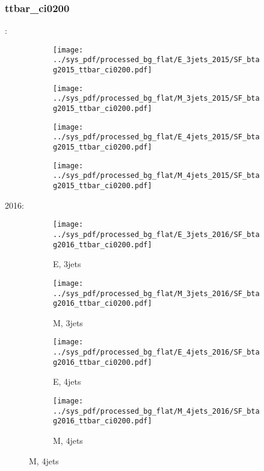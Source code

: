 \documentclass{beamer}
\begin{document}
\begin{frame}
\frametitle{ttbar_ci0200}
\fontsize{5}{1}:
\begin{figure}
\centering
\begin{subfigure}[b]{0.24\textwidth}
\texttt{[image: ../sys\_pdf/processed\_bg\_flat/E\_3jets\_2015/SF\_btag2015\_ttbar\_ci0200.pdf]}
\end{subfigure}
\begin{subfigure}[b]{0.24\textwidth}
\texttt{[image: ../sys\_pdf/processed\_bg\_flat/M\_3jets\_2015/SF\_btag2015\_ttbar\_ci0200.pdf]}
\end{subfigure}
\begin{subfigure}[b]{0.24\textwidth}
\texttt{[image: ../sys\_pdf/processed\_bg\_flat/E\_4jets\_2015/SF\_btag2015\_ttbar\_ci0200.pdf]}
\end{subfigure}
\begin{subfigure}[b]{0.24\textwidth}
\texttt{[image: ../sys\_pdf/processed\_bg\_flat/M\_4jets\_2015/SF\_btag2015\_ttbar\_ci0200.pdf]}
\end{subfigure}
\end{figure}
2016:
\begin{figure}
\centering
\begin{subfigure}[b]{0.24\textwidth}
\texttt{[image: ../sys\_pdf/processed\_bg\_flat/E\_3jets\_2016/SF\_btag2016\_ttbar\_ci0200.pdf]}
\captionsetup{font=tiny}
\caption{E, 3jets}
\end{subfigure}
\begin{subfigure}[b]{0.24\textwidth}
\texttt{[image: ../sys\_pdf/processed\_bg\_flat/M\_3jets\_2016/SF\_btag2016\_ttbar\_ci0200.pdf]}
\captionsetup{font=tiny}
\caption{M, 3jets}
\end{subfigure}
\begin{subfigure}[b]{0.24\textwidth}
\texttt{[image: ../sys\_pdf/processed\_bg\_flat/E\_4jets\_2016/SF\_btag2016\_ttbar\_ci0200.pdf]}
\captionsetup{font=tiny}
\caption{E, 4jets}
\end{subfigure}
\begin{subfigure}[b]{0.24\textwidth}
\texttt{[image: ../sys\_pdf/processed\_bg\_flat/M\_4jets\_2016/SF\_btag2016\_ttbar\_ci0200.pdf]}
\captionsetup{font=tiny}
\caption{M, 4jets}
\end{subfigure}
\end{figure}
\end{frame}
\end{document}
